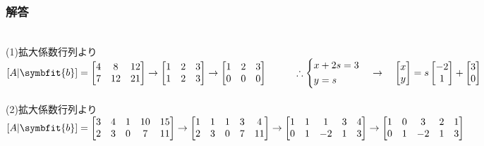 \subsubsection{解答}
\noindent
{}\\(1)拡大係数行列より\\
$[A|\symbfit{b}]=
\begin{bmatrix}
    4 & 8 & 12 \\
    7 & 12 & 21
\end{bmatrix}\rightarrow
\begin{bmatrix}
    1 & 2 & 3 \\
    1 & 2 & 3 \\
\end{bmatrix}\rightarrow
\begin{bmatrix}
    1 & 2 & 3 \\
    0 & 0 & 0
\end{bmatrix} \hspace{1cm}\therefore
\begin{cases*}
    x+2s=3 \\
    y=s 
\end{cases*}\quad \rightarrow \quad
\begin{bmatrix}
    x \\ y
\end{bmatrix}=
s\begin{bmatrix}
    -2 \\ 1  
\end{bmatrix}+
\begin{bmatrix}
    3 \\ 0
\end{bmatrix}$\\\\
(2)拡大係数行列より\\
$[A|\symbfit{b}]=
\begin{bmatrix}
    3 & 4 & 1 & 10 & 15 \\
    2 & 3 & 0 & 7 & 11
\end{bmatrix} \rightarrow
\begin{bmatrix}
    1 & 1 & 1 & 3 & 4 \\
    2 & 3 & 0 & 7 & 11
\end{bmatrix} \rightarrow
\begin{bmatrix}
    1 & 1 & 1 & 3 & 4 \\
    0 & 1 & -2 & 1 & 3 
\end{bmatrix}\rightarrow
\begin{bmatrix}
    1 & 0 & 3 & 2 & 1 \\
    0 & 1 & -2 & 1 & 3 
\end{bmatrix}$\\\\
